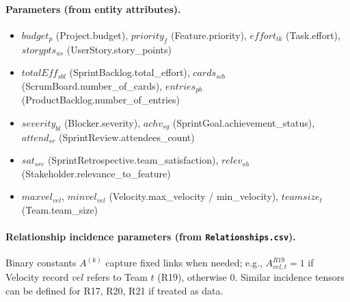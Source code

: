 \documentclass[11pt,a4paper]{article}
\begin{document}
\paragraph{Parameters (from entity attributes).}
\begin{itemize}
  \item $budget_p$ (Project.budget), $priority_f$ (Feature.priority), $effort_{tk}$ (Task.effort), $storypts_{us}$ (UserStory.story\_points)
  \item $totalEff_{sbl}$ (SprintBacklog.total\_effort), $cards_{scb}$ (ScrumBoard.number\_of\_cards), $entries_{pb}$ (ProductBacklog.number\_of\_entries)
  \item $severity_{bl}$ (Blocker.severity), $achv_{sg}$ (SprintGoal.achievement\_status), $attend_{sr}$ (SprintReview.attendees\_count)
  \item $sat_{sre}$ (SprintRetrospective.team\_satisfaction), $relev_{sh}$ (Stakeholder.relevance\_to\_feature)
  \item $maxvel_{vel}$, $minvel_{vel}$ (Velocity.max\_velocity / min\_velocity), $teamsize_t$ (Team.team\_size)
\end{itemize}

\paragraph{Relationship incidence parameters (from \texttt{Relationships.csv}).}
Binary constants $A^{(k)}$ capture fixed links when needed; e.g.,
$A^{R19}_{vel,t}=1$ if Velocity record $vel$ refers to Team $t$ (R19), otherwise $0$.
Similar incidence tensors can be defined for R17, R20, R21 if treated as data.
\end{document}

